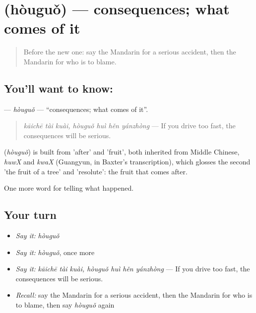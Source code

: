 \section[\texorpdfstring{\zh{后果} (hòuguǒ)}{后果 (hòuguǒ)}]{ (hòuguǒ) — consequences; what comes of it}

\label{lesson:ZH-C297-houguo}



\begin{quote}
Before the new one: say the Mandarin for a serious accident, then the Mandarin for who is to blame.
\end{quote}

\subsection*{You'll want to know: }
\textbf{} — \emph{hòuguǒ} — \textquotedblleft{}consequences; what comes of it\textquotedblright{}.

\begin{quote}
\emph{kāichē tài kuài, hòuguǒ huì hěn yánzhòng} — If you drive too fast, the consequences will be serious.
\end{quote}

\begin{cousinweb}
\textbf{} (\emph{hòuguǒ}) is built from  'after' and  'fruit', both inherited from Middle Chinese, \emph{huwX} and \emph{kwaX} (Guangyun, in Baxter's transcription), which glosses the second 'the fruit of a tree' and 'resolute': the fruit that comes after.
\end{cousinweb}

\begin{grammarlens}[title={What you've built}]
One more word for telling what happened.
\end{grammarlens}

\subsection*{Your turn}
\begin{itemize}
\raggedright
  \item \emph{Say it:} \emph{hòuguǒ}
  \item \emph{Say it:} \emph{hòuguǒ}, once more
  \item \emph{Say it:} \emph{kāichē tài kuài, hòuguǒ huì hěn yánzhòng} — If you drive too fast, the consequences will be serious.
  \item \emph{Recall:} say the Mandarin for a serious accident, then the Mandarin for who is to blame, then say \emph{hòuguǒ} again
\end{itemize}

